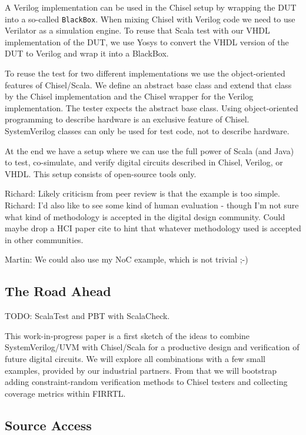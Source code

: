 \documentclass[conference]{IEEEtran}
\newcommand{\code}[1]{{\small{\texttt{#1}}}}
\newcommand{\todo}[1]{{\color{olive} TODO: #1}}
\newcommand{\martin}[1]{{\color{blue} Martin: #1}}
\newcommand{\ducky}[1]{{\color{orange} Richard: #1}}
\begin{document}
A Verilog implementation can be used in the Chisel setup by wrapping the DUT
into a so-called \code{BlackBox}. When mixing Chisel with Verilog code we need
to use Verilator as a simulation engine.
To reuse that Scala test with our VHDL implementation of the DUT, we use Yosys
to convert the VHDL version of the DUT to Verilog and wrap it into a BlackBox.

To reuse the test for two different implementations we use the object-oriented features
of Chisel/Scala. We define an abstract base class and extend that class by the Chisel
implementation and the Chisel wrapper for the Verilog implementation.
The tester expects the abstract base class.
Using object-oriented programming to describe hardware is an exclusive
feature of Chisel. SystemVerilog classes can only be used for test code,
not to describe hardware.

At the end we have a setup where we can use the full power of Scala (and Java)
to test, co-simulate, and verify digital circuits described in Chisel, Verilog, or VHDL.
This setup consists of open-source tools only.

\ducky{Likely criticism from peer review is that the example is too simple.}
\ducky{I'd also like to see some kind of human evaluation - though I'm not sure what kind of methodology is accepted in the digital design community. Could maybe drop a HCI paper cite to hint that whatever methodology used is accepted in other communities.}

\martin{We could also use my NoC example, which is not trivial ;-)}




\subsection{The Road Ahead}

\todo{ScalaTest and PBT with ScalaCheck.}

This work-in-progress paper is a first sketch of the ideas to combine SystemVerilog/UVM
with Chisel/Scala for a productive design and verification of future digital circuits.
We will explore all combinations with a few small examples, provided by our industrial
partners.
From that we will bootstrap adding constraint-random verification methods to Chisel
testers and collecting coverage metrics within FIRRTL.

\subsection{Source Access}
\end{document}
